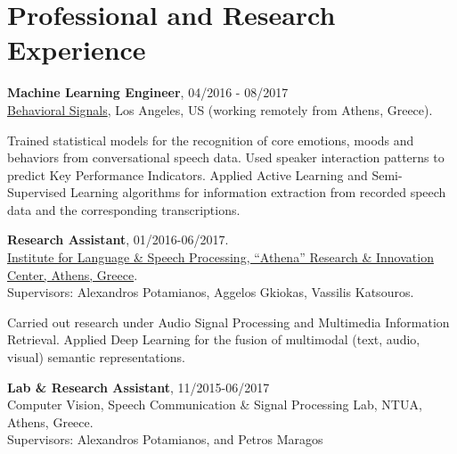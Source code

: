 \documentclass[letterpaper]{article}
\renewenvironment{itemize}{
  \begin{list}{}{
    \setlength{\leftmargin}{1.5em}
  }
}{
  \end{list}
}
\begin{document}
\section*{Professional and Research Experience}

\begin{itemize}

\item 
    \textbf{Machine Learning Engineer}, 04/2016 - 08/2017\\ 
    \href{https://behavioralsignals.com/}{Behavioral Signals}, Los Angeles, US (working remotely from Athens, Greece).
    \begin{itemize}
    \item Trained statistical models for the recognition of core emotions, moods and behaviors from conversational speech data. Used speaker interaction patterns to predict Key Performance Indicators. Applied Active Learning and Semi-Supervised Learning algorithms for information extraction from recorded speech data and the corresponding transcriptions.
    \end{itemize}


    
    

\item 
    \textbf{Research Assistant}, 01/2016-06/2017.\\
    \href{http://www.ilsp.gr/en}{Institute for Language \& Speech Processing, ``Athena'' Research \& Innovation Center, Athens, Greece}.\\
    Supervisors: Alexandros Potamianos, Aggelos Gkiokas, Vassilis Katsouros.


    \begin{itemize}
    \item 
        Carried out research under Audio Signal Processing and Multimedia Information Retrieval. Applied Deep Learning for the fusion of multimodal (text, audio, visual) semantic representations. 
    \end{itemize}
\iffalse
\item 
    \textbf{Lab \& Research Assistant}, 11/2015-06/2017\\
    Computer Vision, Speech Communication \& Signal Processing Lab, NTUA, Athens, Greece.\\
    Supervisors: Alexandros Potamianos, and Petros Maragos


\end{itemize}
\end{document}
